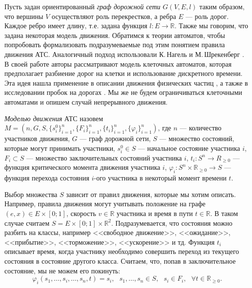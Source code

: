 \documentclass[12pt, a4paper]{article}
\begin{document}
	Пусть задан ориентированный \textit{граф дорожной сети} $ G (V, E, l)$ таким образом, что вершины $V$ осуществляют роль перекрестков, а ребра $E$ --- роль дорог. Каждое ребро имеет длину, т.е. задана функция $l : E \rightarrow \mathbb {R} $. Также мы говорим, что задана некоторая модель движения.
	Обратимся к теории автоматов, чтобы попробовать формализовать подразумеваемые под этим понятием правила движения АТС. Аналогичный подход использовали К.\,Нагель и М.\,Шрекенберг \cite{automat_baza}. В своей работе авторы рассматривают модель клеточных автоматов, которая предполагает разбиение дорог на клетки и использование дискретного времени. Эта идея нашла применение в описании движения физических частиц \cite{automat_phyz}, а также в исследовании пробок на дорогах \cite{automat_jam}. Мы же не будем ограничиваться клеточными автоматами и опишем случай непрерывного движения.
	
	\textit{Моделью движения} АТС назовем $M = \left(n, G, S, \{s^{0}_i\} _{i=1}^n, \{F_i\}_{i = 1}^n, \{t_i\}_{i = 1}^n, \{\varphi_i\}_{i = 1}^n \right)$, где $n$ --- количество участников движения, $G$ --- граф дорожной сети, $S$ --- множество состояний, которые могут принимать участники, $s^0_i \in S$ --- начальное состояние участника $i$, $F_i \subset S$ --- множество заключительных состояний участника $i$, $t_i: S^n \rightarrow R_{\ge0}$ --- функция критического момента движения участника $i$, $\varphi_i: S^n \times \mathbb{R}_{\ge 0} \rightarrow S$ --- функция перехода состояния $i$-ого участника в некоторый момент времени $t$. 
	
	Выбор множества $S$ зависит от правил движения, которые мы хотим описать. Например, правила движения могут учитывать положение на графе $(e, x) \in E \times [0; 1]$, скорость $v \in \mathbb{R}$ участника и время в пути $t \in \mathbb{R}$. В таком случае считаем $S = E \times [0; 1] \times \mathbb{R}^2$.
	Подразумевается, что состояния можно разбить на классы, например <<свободное движение>>, <<ожидание>>, <<прибытие>>, <<торможение>>, <<ускорение>> и тд. Функция $t_i$ описывает время, когда участнику необходимо совершить переход из текущего состояния в состояние другого класса. 
	Считаем, что, попав в заключительное состояние, мы не можем его покинуть:
	$$\varphi_i (s_1, \dots, s_i, \dots, s_n, t) = s_i, \text{ } s_1, \dots, s_n \in S, \text{ } s_i \in F_i, \text{ } \forall t \in \mathbb{R}_{\ge 0}.$$
	
\end{document}
